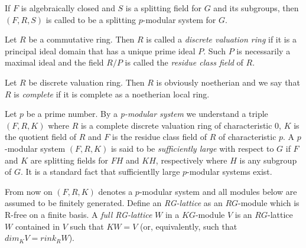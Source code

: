 \documentclass[UTF8]{ctexart}
\begin{document}
\begin{enumerate}
If $F$ is algebraically closed and $S$ is a splitting field for $G$ and its subgroups, then $(F,R,S)$ is called to be a splitting $p$-modular system for $G$.\cite[p.112]{michler2006theory}

Let $R$ be a commutative ring. Then $R$ is called a \textit{discrete valuation ring} if it is a principal ideal domain that has a unique prime ideal $P$. Such $P$ is necessarily a maximal ideal and the field $R/P$ is called the \textit{residue class field} of $R$.

Let $R$ be discrete valuation ring. Then $R$ is obviously noetherian and we say that $R$ is \textit{complete} if it is complete as a noetherian local ring.

Let $p$ be a prime number. By a \textit{p-modular system} we understand a triple $(F,R,K)$ where $R$ is a complete discrete valuation ring of characteristic 0, $K$ is the quotient field of $R$ and $F$ is the residue class field of $R$ of characteristic $p$. A $p$-modular system $(F,R,K)$ is said to be \textit{sufficiently large} with respect to $G$ if $F$ and $K$ are splitting fields for $FH$ and $KH$, respectively where $H$ is any subgroup of $G$. It is a standard fact that sufficientlly large $p$-modular systems exist.

From now on $(F,R,K)$ denotes a $p$-modular system and all modules below are assumed to be finitely generated. Define an \textit{RG-lattice} as an $RG$-module which is R-free on a finite basis. A \textit{full RG-lattice} $W$ in a $KG$-module $V$ is an $RG$-lattice $W$ contained in $V$ such that $KW = V$ (or, equivalently, such that $dim_K V = rink_R W$).\cite[p.307]{karpilovsky1989clifford}\cite[p.140]{karpilovsky2016group}\cite[p.663]{karpilovsky1992part}
\end{enumerate}
\printbibliography
\end{document}
